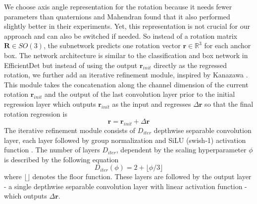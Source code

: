 \documentclass[twocolumn, 10pt, letterpaper]{article}
\begin{document}
We choose axis angle representation for the rotation because it needs fewer parameters than quaternions and Mahendran \etal\cite{axis_angle_vs_quaternion} found that it also performed slightly better in their experiments. Yet, this representation is not crucial for our approach and can also be switched if needed. So instead of a rotation matrix $\mathbf{R} \in SO(3)$, the subnetwork predicts one rotation vector $\textbf{r}\in\mathbb{R}^{3}$ for each anchor box. The network architecture is similar to the classification and box network in EfficientDet\cite{EfficientDet} but instead of using the output $\textbf{r}_{init}$ directly as the regressed rotation, we further add an iterative refinement module, inspired by Kanazawa \etal\cite{HMR}. This module takes the concatenation along the channel dimension of the current rotation $\textbf{r}_{init}$ and the output of the last convolution layer prior to the initial regression layer which outputs $\textbf{r}_{init}$ as the input and regresses $\Delta \textbf{r}$ so that the final rotation regression is 
\begin{equation}
\label{equation_rotation_r}
\textbf{r} = \textbf{r}_{init} + \Delta \textbf{r}
\end{equation}
The iterative refinement module consists of $D_{iter}$ depthwise separable convolution layer\cite{DepthwiseSeparableConv}, each layer followed by group normalization \cite{GroupNorm} and SiLU (swish-1) activation function \cite{swish_1}\cite{swish_2}\cite{swish_3}. The number of layers $D_{iter}$, dependent by the scaling hyperparameter $\phi$ is described by the following equation
\begin{equation}
\label{equation_d_iter}
D_{iter}(\phi) = 2 + \lfloor \phi / 3 \rfloor
\end{equation}
where $\lfloor \rfloor$ denotes the floor function. These layers are followed by the output layer - a single depthwise separable convolution layer with linear activation function - which outputs $\Delta \textbf{r}$.\\
\end{document}
